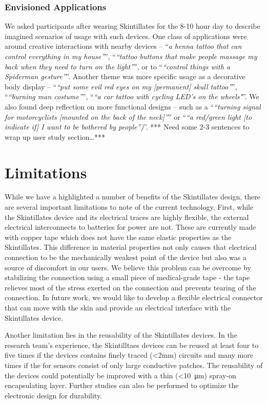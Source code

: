 \documentclass{sigchi}
\begin{document}
\subsubsection{Envisioned Applications}
We asked participants after wearing Skintillates for the 8-10 hour day to describe imagined scenarios of usage with such devices. One class of applications were around creative interactions with nearby devices – ``\textit{a henna tattoo that can control everything in my house”}'', ``\textit{“tattoo buttons that make people massage my back when they need to turn on the light”}'', or to ``\textit{“control things with a Spiderman gesture”}''.  Another theme was more specific usage as a decorative body display – ``\textit{“put some evil red eyes on my [permanent] skull tattoo”}'', ``\textit{“burning man costume”}'',  ``\textit{“a car tattoo with cycling LED’s on the wheels"}''. We also found deep reflection on more functional designs -- such as a ``\textit{“turning signal for motorcyclists [mounted on the back of the neck]”}'' or ``\textit{“a red/green light [to indicate if] I want to be bothered by people”)}''.
*** Need some 2-3 sentences to wrap up user study section…***
\section {Limitations}
While we have a highlighted a number of benefits of the Skintillates design, there are several important limitations to note of the current technology. First, while the Skintillates device and its electrical traces are highly flexible, the external electrical interconnects to batteries for power are not.  These are currently made with copper tape which does not have the same elastic properties as the Skintillates. This difference in material properties not only causes that electrical connection to be the mechanically weakest point of the device but also was a source of discomfort in our users. We believe this problem can be overcome by stabilizing the connection using a small piece of medical-grade tape - the tape relieves most of the stress exerted on the connection and prevents tearing of the connection. In future work, we would like to develop a flexible electrical connector that can move with the skin and provide an electrical interface with the Skintillates device.

Another limitation lies in the reusability of the Skintillates devices. In the research team's experience, the Skintilltaes devices can be reused at least four to five times if the devices contains finely traced (\textless 2mm) circuits and many more times if the for sensors consist of only large conductive patches. The reusability of the devices could potentially be improved with a thin (\textless10\SI{}{\micro\metre})
 spray-on encapsulating layer. Further studies can also be performed to optimize the electronic design for durability. 
\end{document}
